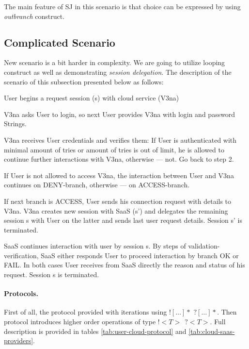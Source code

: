 \documentclass{llncs}
\begin{document}
The main feature of SJ in this scenario is that choice can be expressed by using \textit{outbranch} construct.

\subsection{Complicated Scenario}
New scenario is a bit harder in complexity. We are going to utilize looping construct as well as demonstrating \textit{session delegation}. The description of the scenario of this subsection presented below as follows:
\begin{compactenum}
\item  User begins a request session (s) with cloud service (V3na)

\item  V3na asks User to login, so next User provides V3na with login and password Strings.

\item  V3na receives User credentials and verifies them: If User is authenticated with minimal amount of tries or amount of tries is out of limit, he is allowed to continue further interactions with V3na, otherwise --- not. Go back to step 2.

\item  If User is not allowed to access V3na, the interaction between User and V3na continues on DENY-branch, otherwise --- on ACCESS-branch.

\item  If next branch is ACCESS, User sends his connection request with details to V3na. V3na creates new session with SaaS (s') and delegates the remaining session s with User on the latter and sends last user request details. Session s' is terminated.

\item  SaaS continues interaction with user by session s. By steps of validation-verification, SaaS either responds User to proceed interaction by branch OK or FAIL. In both cases User receives from SaaS directly the reason and status of his request. Session s is terminated.
\end{compactenum}

\paragraph{Protocols.} First of all, the protocol provided with iterations using $![\dots]*$ $?[\dots]*$. Then protocol introduces higher order operations of type $!<T>\ \ ?<T>$. Full description is provided in tables \ref{tab:user-cloud-protocol} and \ref{tab:cloud-saas-providers}.
\end{document}
